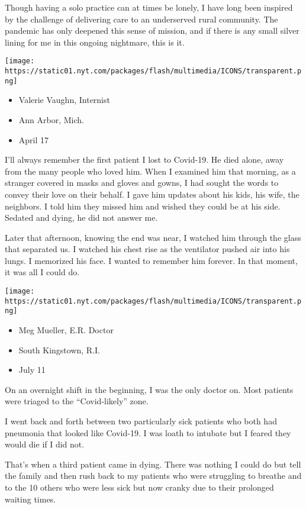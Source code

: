 Though having a solo practice can at times be lonely, I have long been
inspired by the challenge of delivering care to an underserved rural
community. The pandemic has only deepened this sense of mission, and if
there is any small silver lining for me in this ongoing nightmare, this
is it.

\texttt{[image: https://static01.nyt.com/packages/flash/multimedia/ICONS/transparent.png]}

\begin{itemize}
\tightlist
\item
  Valerie Vaughn, Internist
\item
  Ann Arbor, Mich.
\item
  April 17
\end{itemize}

I'll always remember the first patient I lost to Covid-19. He died
alone, away from the many people who loved him. When I examined him that
morning, as a stranger covered in masks and gloves and gowns, I had
sought the words to convey their love on their behalf. I gave him
updates about his kids, his wife, the neighbors. I told him they missed
him and wished they could be at his side. Sedated and dying, he did not
answer me.

Later that afternoon, knowing the end was near, I watched him through
the glass that separated us. I watched his chest rise as the ventilator
pushed air into his lungs. I memorized his face. I wanted to remember
him forever. In that moment, it was all I could do.

\texttt{[image: https://static01.nyt.com/packages/flash/multimedia/ICONS/transparent.png]}

\begin{itemize}
\tightlist
\item
  Meg Mueller, E.R. Doctor
\item
  South Kingstown, R.I.
\item
  July 11
\end{itemize}

On an overnight shift in the beginning, I was the only doctor on. Most
patients were triaged to the ``Covid-likely'' zone.

I went back and forth between two particularly sick patients who both
had pneumonia that looked like Covid-19. I was loath to intubate but I
feared they would die if I did not.

That's when a third patient came in dying. There was nothing I could do
but tell the family and then rush back to my patients who were
struggling to breathe and to the 10 others who were less sick but now
cranky due to their prolonged waiting times.

